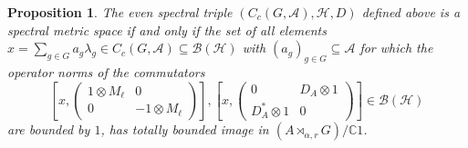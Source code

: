 \documentclass[a4paper,11pt,reqno]{amsart}
\numberwithin{equation}{section}
\numberwithin{equation}{section}
\newtheorem{proposition}[theorem]{Proposition}
\theoremstyle{definition}
\theoremstyle{remark}
\theoremstyle{remark}
\begin{document}
\begin{proposition} \label{QuantumMetricSpaceCharacterization2}
The even spectral triple $(C_{c}(G,\mathcal{A}),\mathcal{H},D)$ defined
above is a spectral metric space if and only if the set of
all elements $x=\sum_{g\in G}a_{g}\lambda_{g}\in C_{c}(G,\mathcal{A})\subseteq\mathcal{B}(\mathcal{H})$
with $(a_{g})_{g\in G}\subseteq\mathcal{A}$ for which the operator norms of the commutators
\[
\left[x,\left(\begin{array}{cc}
1\otimes M_{\ell} & 0\\
0 & -1\otimes M_{\ell}
\end{array}\right)\right],\left[x,\left(\begin{array}{cc}
0 & D_{A}\otimes1\\
D_{A}^{\ast}\otimes1 & 0
\end{array}\right)\right]\in\mathcal{B}(\mathcal{H})
\]
are bounded by $1$, has totally bounded image in $(A\rtimes_{\alpha,r}G)/\mathbb{C}1$.
\end{proposition}
\end{document}
